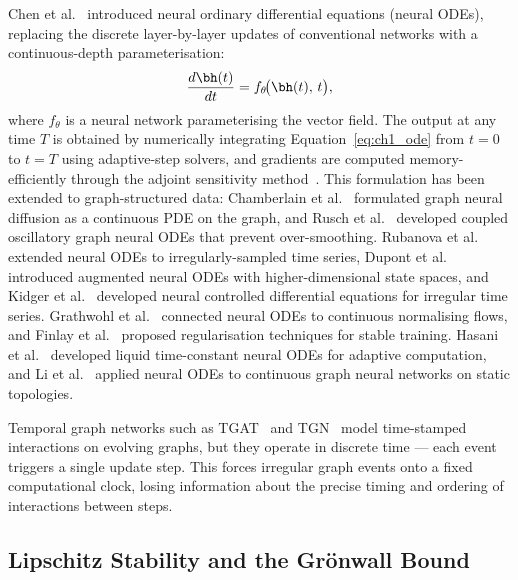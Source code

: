 Chen et al.~\cite{Chen2018} introduced neural ordinary differential equations (neural ODEs), replacing the discrete layer-by-layer updates of conventional networks with a continuous-depth parameterisation:
\begin{equation}
\frac{d\bh(t)}{dt} = f_\theta\!\bigl(\bh(t),\, t\bigr),
\label{eq:ch1_ode}
\end{equation}
where $f_\theta$ is a neural network parameterising the vector field. The output at any time $T$ is obtained by numerically integrating Equation~\eqref{eq:ch1_ode} from $t=0$ to $t=T$ using adaptive-step solvers, and gradients are computed memory-efficiently through the adjoint sensitivity method~\cite{Pontryagin1962}. This formulation has been extended to graph-structured data: Chamberlain et al.~\cite{Chamberlain2021} formulated graph neural diffusion as a continuous PDE on the graph, and Rusch et al.~\cite{Rusch2022} developed coupled oscillatory graph neural ODEs that prevent over-smoothing. Rubanova et al.~\cite{Rubanova2019} extended neural ODEs to irregularly-sampled time series, Dupont et al.~\cite{Dupont2019} introduced augmented neural ODEs with higher-dimensional state spaces, and Kidger et al.~\cite{Kidger2020} developed neural controlled differential equations for irregular time series. Grathwohl et al.~\cite{Grathwohl2019} connected neural ODEs to continuous normalising flows, and Finlay et al.~\cite{Finlay2020} proposed regularisation techniques for stable training. Hasani et al.~\cite{Hasani2021} developed liquid time-constant neural ODEs for adaptive computation, and Li et al.~\cite{Li2020ode} applied neural ODEs to continuous graph neural networks on static topologies.

Temporal graph networks such as TGAT~\cite{Xu2020tgat} and TGN~\cite{Rossi2020} model time-stamped interactions on evolving graphs, but they operate in discrete time --- each event triggers a single update step. This forces irregular graph events onto a fixed computational clock, losing information about the precise timing and ordering of interactions between steps.


\subsection{Lipschitz Stability and the Gr\"{o}nwall Bound}

